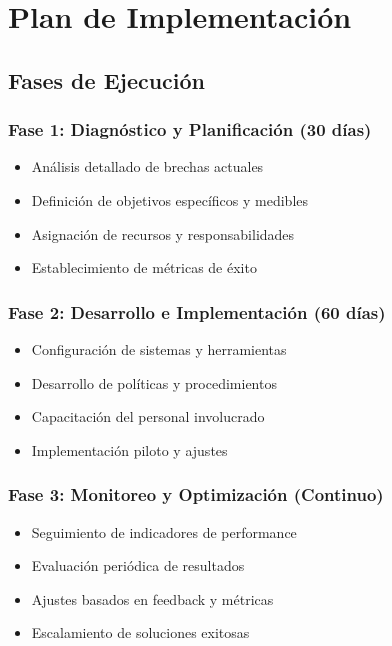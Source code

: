 \documentclass[11pt]{report}
\begin{document}
\chapter{Plan de Implementación}

\section{Fases de Ejecución}
\subsection{Fase 1: Diagnóstico y Planificación (30 días)}
\begin{itemize}
    \item Análisis detallado de brechas actuales
    \item Definición de objetivos específicos y medibles
    \item Asignación de recursos y responsabilidades
    \item Establecimiento de métricas de éxito
\end{itemize}

\subsection{Fase 2: Desarrollo e Implementación (60 días)}
\begin{itemize}
    \item Configuración de sistemas y herramientas
    \item Desarrollo de políticas y procedimientos
    \item Capacitación del personal involucrado
    \item Implementación piloto y ajustes
\end{itemize}

\subsection{Fase 3: Monitoreo y Optimización (Continuo)}
\begin{itemize}
    \item Seguimiento de indicadores de performance
    \item Evaluación periódica de resultados
    \item Ajustes basados en feedback y métricas
    \item Escalamiento de soluciones exitosas
\end{itemize}
\end{document}
